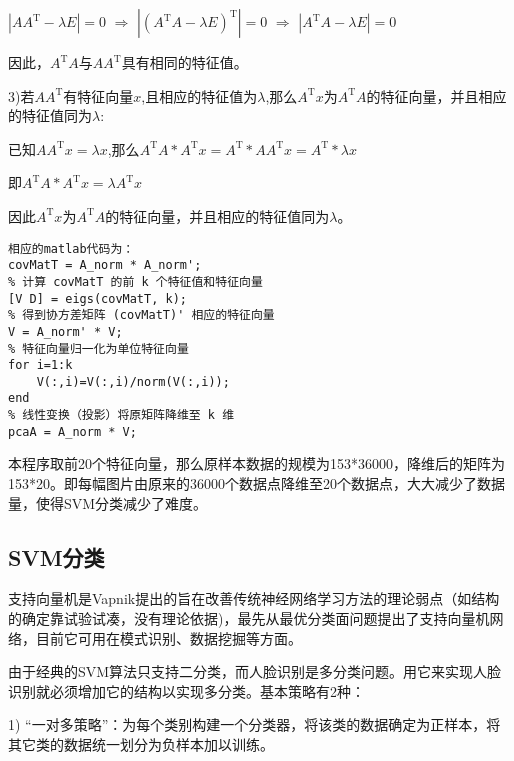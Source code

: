 \documentclass[a4paper,12pt]{ctexart}
\begin{document}
$\left| AA^\mathrm{T}-\lambda E  \right|=0$ \quad $\Longrightarrow$   $\left| (A^\mathrm{T}A-\lambda E)^\mathrm{T}  \right|=0$
\quad $\Longrightarrow$  $\left| A^\mathrm{T}A-\lambda E  \right|= 0$

因此，$A^\mathrm{T}A$与$AA^\mathrm{T}$具有相同的特征值。
 \quad
 \newline
 
 3)若$AA^\mathrm{T}$有特征向量$x$,且相应的特征值为$\lambda$,那么$A^\mathrm{T}x$为$A^\mathrm{T}A$的特征向量，并且相应的特征值同为$\lambda$:

 已知$AA^\mathrm{T}x=\lambda x$,那么$A^\mathrm{T}A*A^\mathrm{T}x=A^\mathrm{T}*AA^\mathrm{T}x=A^\mathrm{T}*\lambda x$

 即$A^\mathrm{T}A*A^\mathrm{T}x=\lambda A^\mathrm{T} x$

 因此$A^\mathrm{T}x$为$A^\mathrm{T}A$的特征向量，并且相应的特征值同为$\lambda$。
 
\begin{lstlisting}
相应的matlab代码为：
covMatT = A_norm * A_norm';
% 计算 covMatT 的前 k 个特征值和特征向量
[V D] = eigs(covMatT, k);
% 得到协方差矩阵 (covMatT)' 相应的特征向量
V = A_norm' * V;
% 特征向量归一化为单位特征向量
for i=1:k
    V(:,i)=V(:,i)/norm(V(:,i));
end
% 线性变换（投影）将原矩阵降维至 k 维
pcaA = A_norm * V;
 \end{lstlisting}
 本程序取前20个特征向量，那么原样本数据的规模为153*36000，降维后的矩阵为153*20。即每幅图片由原来的36000个数据点降维至20个数据点，大大减少了数据量，使得SVM分类减少了难度。

 
 \subsection{SVM分类}
 支持向量机是Vapnik提出的旨在改善传统神经网络学习方法的理论弱点（如结构的确定靠试验试凑，没有理论依据)，最先从最优分类面问题提出了支持向量机网络，目前它可用在模式识别、数据挖掘等方面。

 由于经典的SVM算法只支持二分类，而人脸识别是多分类问题。用它来实现人脸识别就必须增加它的结构以实现多分类。基本策略有2种：

 1) “一对多策略”：为每个类别构建一个分类器，将该类的数据确定为正样本，将其它类的数据统一划分为负样本加以训练。
 
\end{document}

